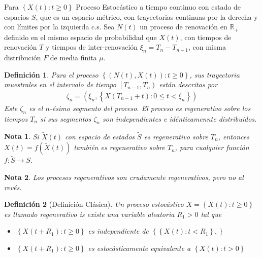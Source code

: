 \documentclass{article}
\newtheorem{Def}{Definición}[section]
\newtheorem{Note}{Nota}[section]
\newcommand{\rea}{\mathbb{R}}
\numberwithin{equation}{section}
\begin{document}
{%

Para $\left\{X\left(t\right):t\geq0\right\}$ Proceso Estoc\'astico a tiempo continuo con estado de espacios $S$, que es un espacio m\'etrico, con trayectorias continuas por la derecha y con l\'imites por la izquierda c.s. Sea $N\left(t\right)$ un proceso de renovaci\'on en $\rea_{+}$ definido en el mismo espacio de probabilidad que $X\left(t\right)$, con tiempos de renovaci\'on $T$ y tiempos de inter-renovaci\'on $\xi_{n}=T_{n}-T_{n-1}$, con misma distribuci\'on $F$ de media finita $\mu$.



\begin{Def}
Para el proceso $\left\{\left(N\left(t\right),X\left(t\right)\right):t\geq0\right\}$, sus trayectoria muestrales en el intervalo de tiempo $\left[T_{n-1},T_{n}\right)$ est\'an descritas por
\begin{eqnarray*}
\zeta_{n}=\left(\xi_{n},\left\{X\left(T_{n-1}+t\right):0\leq t<\xi_{n}\right\}\right)
\end{eqnarray*}
Este $\zeta_{n}$ es el $n$-\'esimo segmento del proceso. El proceso es regenerativo sobre los tiempos $T_{n}$ si sus segmentos $\zeta_{n}$ son independientes e id\'enticamennte distribuidos.
\end{Def}


\begin{Note}
Si $\tilde{X}\left(t\right)$ con espacio de estados $\tilde{S}$ es regenerativo sobre $T_{n}$, entonces $X\left(t\right)=f\left(\tilde{X}\left(t\right)\right)$ tambi\'en es regenerativo sobre $T_{n}$, para cualquier funci\'on $f:\tilde{S}\rightarrow S$.
\end{Note}

\begin{Note}
Los procesos regenerativos son crudamente regenerativos, pero no al rev\'es.
\end{Note}

\begin{Def}[Definici\'on Cl\'asica]
Un proceso estoc\'astico $X=\left\{X\left(t\right):t\geq0\right\}$ es llamado regenerativo is existe una variable aleatoria $R_{1}>0$ tal que
\begin{itemize}
\item[i)] $\left\{X\left(t+R_{1}\right):t\geq0\right\}$ es independiente de $\left\{\left\{X\left(t\right):t<R_{1}\right\},\right\}$
\item[ii)] $\left\{X\left(t+R_{1}\right):t\geq0\right\}$ es estoc\'asticamente equivalente a $\left\{X\left(t\right):t>0\right\}$
\end{itemize}


\end{Def}}
\end{document}
